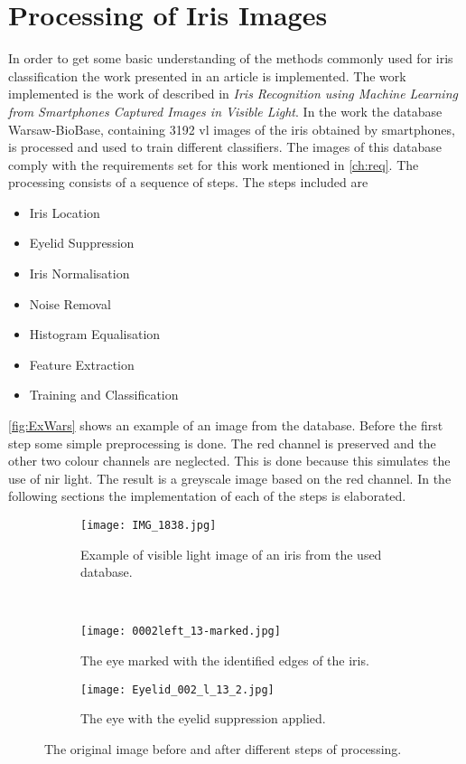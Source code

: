\section{Processing of Iris Images}
\label{BasicM}
In order to get some basic understanding of the methods commonly used for iris classification the work presented in an article is implemented. The work implemented is the work of \cite{Khan2017a} described in \textit{Iris Recognition using Machine Learning from Smartphones Captured Images in Visible Light}. In the work the database Warsaw-BioBase, containing 3192 \gls{vl} images of the iris obtained by smartphones, is processed and used to train different classifiers. The images of this database comply with the requirements set for this work mentioned in \autoref{ch:req}. The processing consists of a sequence of steps. The steps included are

\begin{itemize}
\item Iris Location
\item Eyelid Suppression
\item Iris Normalisation
\item Noise Removal
\item Histogram Equalisation 
\item Feature Extraction
\item Training and Classification
\end{itemize}
\autoref{fig:ExWars} shows an example of an image from the database. Before the first step some simple preprocessing is done. The red channel is preserved and the other two colour channels are neglected. This is done because this simulates the use of \gls{nir} light. The result is a greyscale image based on the red channel. In the following sections the implementation of each of the steps is elaborated. 

\begin{figure}[h]
\centering
\begin{subfigure}{.47\textwidth}
\centering
\texttt{[image: IMG\_1838.jpg]}
\caption{Example of visible light image of an iris from the used database.}
\label{fig:ExWars}
\end{subfigure}
~
\begin{subfigure}{.47\textwidth}
\centering
\texttt{[image: 0002left\_13-marked.jpg]}
\caption{The eye marked with the identified edges of the iris.}
\label{fig:MarkedI}
\end{subfigure}

\begin{subfigure}{.47\textwidth}
\centering
\texttt{[image: Eyelid\_002\_l\_13\_2.jpg]}
\caption{The eye with the eyelid suppression applied.}
\label{fig:IrisSup}
\end{subfigure}
\caption{The original image before and after different steps of processing.}
\end{figure}



